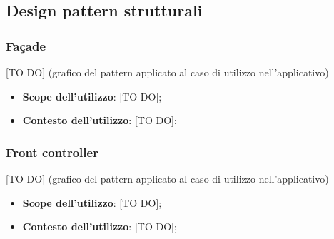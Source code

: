 %


\subsection{Design pattern strutturali} %
\label{sub:design_pattern_strutturali}
	\subsubsection{Fa\c{c}ade} %
	\label{ssub:facade}
	[TO DO] (grafico del pattern applicato al caso di utilizzo nell'applicativo)
		\begin{itemize}
			\item \textbf{Scope dell'utilizzo}: [TO DO];
			\item \textbf{Contesto dell'utilizzo}: [TO DO];
		\end{itemize}
    \subsubsection{Front controller} %
    \label{ssub:front_controller}
    [TO DO] (grafico del pattern applicato al caso di utilizzo nell'applicativo)
        \begin{itemize}
            \item \textbf{Scope dell'utilizzo}: [TO DO];
            \item \textbf{Contesto dell'utilizzo}: [TO DO];
        \end{itemize}



